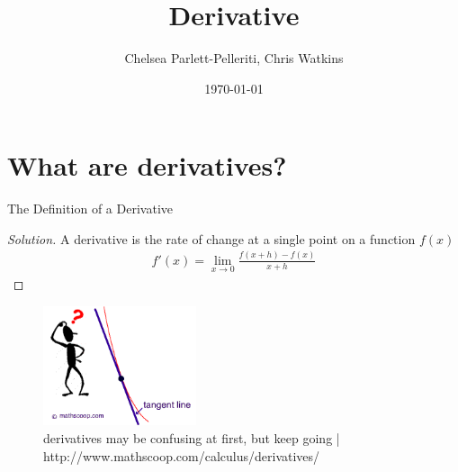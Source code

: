 \documentclass[aps,pra,notitlepage,amsmath,amssymb,letterpaper,12pt]{revtex4-1}
\newenvironment{problem}[2][Problem]{\begin{trivlist}
\item[\hskip \labelsep {\bfseries #1}\hskip \labelsep {\bfseries #2.}]}{\end{trivlist}}
\newenvironment{solution}{\begin{proof}[Solution]}{\end{proof}}
\begin{document}
 
\title{Derivative}
\author{Chelsea Parlett-Pelleriti, Chris Watkins}
\date{\today}

\maketitle

\section{What are derivatives?} %

\begin{problem}{1} 
The Definition of a Derivative
\end{problem}
 
\begin{solution} %
A derivative is the rate of change at a single point on a function $f(x)$ 
\begin{align}
f'(x) = \lim_{x \rightarrow 0} \frac{f(x+h)-f(x)}{x+h}
\end{align}
\end{solution}



\begin{figure}[h!] %
  \includegraphics[width=0.4\textwidth]{1.png}  %
  \caption{derivatives may be confusing at first, but keep going | http://www.mathscoop.com/calculus/derivatives/}
  \label{fig:figlabel}
\end{figure}

 
 
\end{document}
